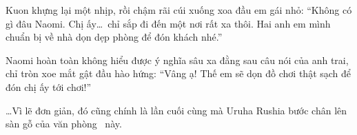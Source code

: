\documentclass[../main.tex]{subfiles}
\begin{document}
Kuon khựng lại một nhịp, rồi chậm rãi cúi xuống xoa đầu em gái nhỏ: ``Không có gì đâu Naomi. Chị ấy\dots\ chỉ sắp đi đến một nơi rất xa thôi. Hai anh em mình chuẩn bị về nhà dọn dẹp phòng để đón khách nhé.''

Naomi hoàn toàn không hiểu được ý nghĩa sâu xa đằng sau câu nói của anh trai, chỉ tròn xoe mắt gật đầu hào hứng: ``Vâng ạ! Thế em sẽ dọn đồ chơi thật sạch để đón chị ấy tới chơi!''

\dots Vì lẽ đơn giản, đó cũng chính là lần cuối cùng mà Uruha Rushia bước chân lên sàn gỗ của văn phòng \hll\ này.
\end{document}
